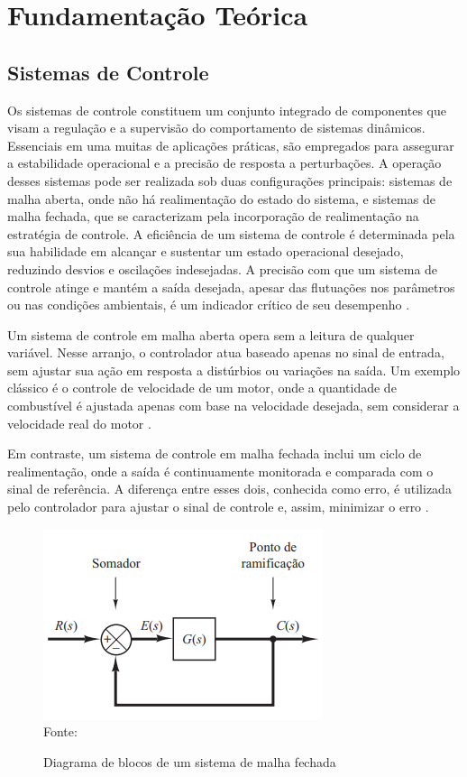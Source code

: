 \chapter{Fundamentação Teórica}


\section{Sistemas de Controle}

Os sistemas de controle constituem um conjunto integrado de componentes que visam a regulação e a supervisão do
comportamento de sistemas dinâmicos.
Essenciais em uma muitas de aplicações práticas, são empregados para assegurar a estabilidade operacional e a precisão de resposta a perturbações.
A operação desses sistemas pode ser realizada sob duas configurações principais: sistemas de malha aberta,
onde não há realimentação do estado do sistema, e sistemas de malha fechada, que se caracterizam pela incorporação de
realimentação na estratégia de controle.
A eficiência de um sistema de controle é determinada pela sua habilidade em alcançar e sustentar um estado operacional
desejado, reduzindo desvios e oscilações indesejadas.
A precisão com que um sistema de controle atinge e mantém a saída desejada, apesar das flutuações nos parâmetros ou nas
condições ambientais, é um indicador crítico de seu desempenho \cite{ogata2010engenharia}.

Um sistema de controle em malha aberta opera sem a leitura de qualquer variável.
Nesse arranjo, o controlador atua baseado apenas no sinal de entrada, sem ajustar sua ação em resposta a distúrbios ou
variações na saída.
Um exemplo clássico é o controle de velocidade de um motor, onde a quantidade de combustível é ajustada apenas com base
na velocidade desejada, sem considerar a velocidade real do motor \cite{ogata2010engenharia}.

Em contraste, um sistema de controle em malha fechada inclui um ciclo de realimentação, onde a saída é continuamente
monitorada e comparada com o sinal de referência.
A diferença entre esses dois, conhecida como erro, é utilizada pelo controlador para ajustar o sinal de controle e,
assim, minimizar o erro \cite{ogata2010engenharia}.

\begin{figure}[H]
    \centering
    \caption{Diagrama de blocos de um sistema de malha fechada}
    \includegraphics[scale=1]{figuras/closed_loop}
    \label{fig:closed_loop}
    \\
    \vspace{0cm}\hspace{0cm}\small{Fonte: \cite[Fig 2.3]{ogata2010engenharia}}
\end{figure}

